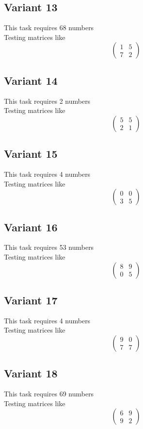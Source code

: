 \documentclass[11pt]{article}
\begin{document}
\subsection*{Variant 13}
This task requires 68 numbers\\
Testing matrices like \[ \begin{pmatrix} 1 & 5\\ 7 & 2 \end{pmatrix} \]

\subsection*{Variant 14}
This task requires 2 numbers\\
Testing matrices like \[ \begin{pmatrix} 5 & 5\\ 2 & 1 \end{pmatrix} \]

\subsection*{Variant 15}
This task requires 4 numbers\\
Testing matrices like \[ \begin{pmatrix} 0 & 0\\ 3 & 5 \end{pmatrix} \]

\subsection*{Variant 16}
This task requires 53 numbers\\
Testing matrices like \[ \begin{pmatrix} 8 & 9\\ 0 & 5 \end{pmatrix} \]

\subsection*{Variant 17}
This task requires 4 numbers\\
Testing matrices like \[ \begin{pmatrix} 9 & 0\\ 7 & 7 \end{pmatrix} \]

\subsection*{Variant 18}
This task requires 69 numbers\\
Testing matrices like \[ \begin{pmatrix} 6 & 9\\ 9 & 2 \end{pmatrix} \]
\end{document}
